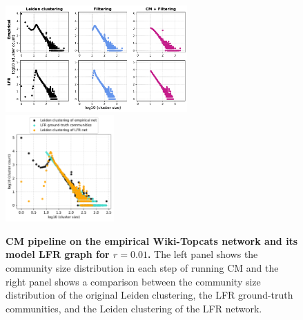 \documentclass[11pt]{article}   	%
\begin{document}
\begin{figure}[h!]
\centering
\includegraphics[width=0.62\textwidth]{figs/wiki_topcats_cm_steps_lfr01.pdf}
\includegraphics[width=0.37\textwidth]{figs/wiki_topcats_01_cm_size.pdf}
\caption[CM pipeline on the  empirical Wiki-Topcats  network and its model LFR graph for r=0.01]{\textbf{CM pipeline on the empirical Wiki-Topcats network and its model LFR graph for $r=0.01$.} The left panel shows the community size distribution in each step of running CM and the right panel shows a comparison between the community size distribution of the original Leiden clustering, the LFR ground-truth communities, and the Leiden clustering of the LFR network.}
\label{fig:wikitopcats-cm-lfr-01}
\end{figure}
\end{document}
